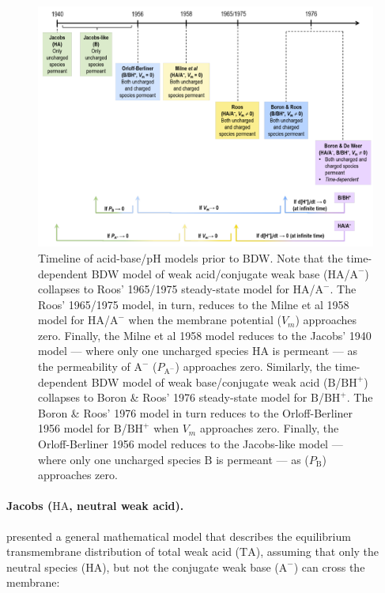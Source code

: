 \documentclass[fleqn,10pt]{physiome}
\begin{document}
\begin{figure}
\centering
\includegraphics[scale=0.25]{Figure 8.png}
\caption{\label{fig:8} Timeline of acid-base/$\mathrm{pH}$ models prior to BDW. Note that the time-dependent BDW model of weak acid/conjugate weak base ($\mathrm{HA}$/$\mathrm{A^-}$) collapses to Roos' 1965/1975 steady-state model for $\mathrm{HA}$/$\mathrm{A^-}$. The Roos' 1965/1975 model, in turn, reduces to the Milne et al 1958 model for $\mathrm{HA}$/$\mathrm{A^-}$ when the membrane potential ($V_m$) approaches zero. Finally, the Milne et al 1958 model reduces to the Jacobs' 1940 model --- where only one uncharged species $\mathrm{HA}$ is permeant --- as the permeability of $\mathrm{A^-}$ ($P_\mathrm{A^-}$) approaches zero. Similarly, the time-dependent BDW model of weak base/conjugate weak acid ($\mathrm{B}$/$\mathrm{BH^+}$) collapses to Boron \& Roos' 1976 steady-state model for $\mathrm{B}$/$\mathrm{BH^+}$. The Boron \& Roos' 1976 model in turn reduces to the Orloff-Berliner 1956 model for $\mathrm{B}$/$\mathrm{BH^+}$ when $V_m$ approaches zero. Finally, the Orloff-Berliner 1956 model reduces to the Jacobs-like model --- where only one uncharged species $\mathrm{B}$ is permeant --- as ($P_\mathrm{B}$) approaches zero.}
\end{figure}


\paragraph{Jacobs ($\mathrm{HA}$, neutral weak acid).} \cite{jacobs1940some} presented a general mathematical model that describes the equilibrium transmembrane distribution of total weak acid ($\mathrm{TA}$), assuming that only the neutral species ($\mathrm{HA}$), but not the conjugate weak base ($\mathrm{A^-}$) can cross the membrane:
\end{document}
